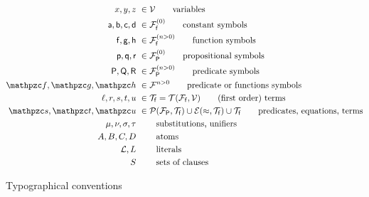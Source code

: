 \begin{figure}[hbt]\label{fig:conventions}
	\begin{align*}
	x,y,z &\ \in\mcV \tag*{variables} \\
	\ma,\mb,\mc,\md &\ \in\mcFfn[{0}]\tag*{constant symbols} \\
	\mf, \mg, \mh &\ \in\mcFfn[{n>0}]\tag*{function symbols} \\
	\mpp, \mq, \mr &\ \in\mcFPn[{0}]\tag*{propositional symbols}\\
	\mP, \mQ, \mR &\ \in\mcFPn[{n>0}]\tag*{predicate symbols}\\
	\mcf, \mcg, \mch &\ \in\mcF^{n>0} \tag*{predicate or functions symbols}\\
	\ell, r, s,t,u &\ \in\mcTf = \mcTFfV\tag*{(first order) terms}\\
	\mcs, \mct, \mcu &\ \in \mcPT \cup \mcET \cup \mcTf \tag*{predicates, equations, terms}\\
	\mu, \nu, \sigma, \tau &\ \tag*{substitutions, unifiers}\\
	A,B,C,D &\ \tag*{atoms} \\
	\mcL, L &\ \tag*{literals} \\
	S &\ \tag*{sets of clauses}
	\end{align*}
	\caption{Typographical conventions}
\end{figure}










